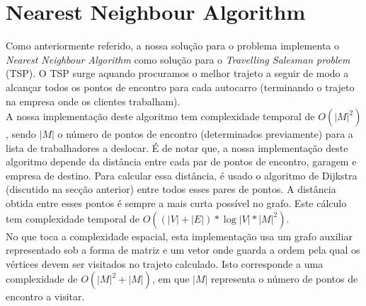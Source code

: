\documentclass{report}
\begin{document}
  \newpage
  \section{Nearest Neighbour Algorithm}
    Como anteriormente referido, a nossa solução para o problema implementa o
    \textit{Nearest Neighbour Algorithm} como solução para o
    \textit{Travelling Salesman problem} (TSP). O TSP surge aquando procuramos
    o melhor trajeto a seguir de modo a alcançar todos os pontos de encontro
    para cada autocarro (terminando o trajeto na empresa onde os clientes
    trabalham).\\
    A nossa implementação deste algoritmo tem complexidade temporal de
    $O(|M|^2)$, sendo $|M|$ o número de pontos de encontro (determinados
    previamente) para a lista de trabalhadores a deslocar. É de notar que,
    a nossa implementação deste algoritmo depende da distância entre cada par
    de pontos de encontro, garagem e empresa de destino. Para calcular essa
    distância, é usado o algoritmo de Dijkstra\cite{DIJKSTRA} (discutido
    na secção anterior) entre todos esses pares de pontos. A distância
    obtida entre esses pontos é sempre a mais curta possível no grafo.
    Este cálculo tem complexidade temporal de
    $O((|V| + |E|) * \log|V| * |M|^2)$.\\
    \newline
    No que toca a complexidade espacial, esta implementação usa um grafo auxiliar
    representado sob a forma de matriz e um vetor onde guarda a ordem pela qual
    os vértices devem ser visitados no trajeto calculado.
    Isto corresponde a uma complexidade de $O(|M|^2 + |M|)$, em que $|M|$
    representa o número de pontos de encontro a visitar.

  \newpage
\end{document}
